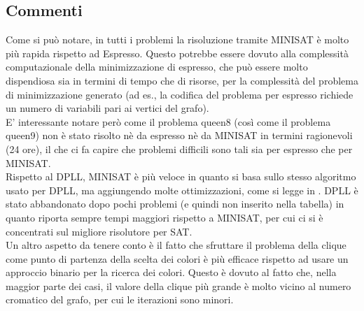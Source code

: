 \documentclass[a4paper,11pt]{article} %
\begin{document}


\subsection{Commenti}
Come si può notare, in tutti i problemi la risoluzione tramite MINISAT è molto più rapida rispetto ad Espresso. Questo potrebbe essere dovuto alla complessità computazionale della minimizzazione di espresso, che può essere molto dispendiosa sia in termini di tempo che di risorse, per la complessità del problema di minimizzazione generato (ad es., la codifica del problema per espresso richiede un numero di variabili pari ai vertici del grafo).\\
E' interessante notare però come il problema queen8 (così come il problema queen9) non è stato risolto nè da espresso nè da MINISAT in termini ragionevoli (24 ore), il che ci fa capire che problemi difficili sono tali sia per espresso che per MINISAT.\\
Rispetto al DPLL, MINISAT è più veloce in quanto si basa sullo stesso algoritmo usato per DPLL, ma aggiungendo molte ottimizzazioni, come si legge in \cite{minisat}. DPLL è stato abbandonato dopo pochi problemi (e quindi non inserito nella tabella) in quanto riporta sempre tempi maggiori rispetto a MINISAT, per cui ci si è concentrati sul migliore risolutore per SAT.\\
Un altro aspetto da tenere conto è il fatto che sfruttare il problema della clique come punto di partenza della scelta dei colori è più efficace rispetto ad usare un approccio binario per la ricerca dei colori. Questo è dovuto al fatto che, nella maggior parte dei casi, il valore della clique più grande è molto vicino al numero cromatico del grafo, per cui le iterazioni sono minori.

\pagebreak
\end{document}
